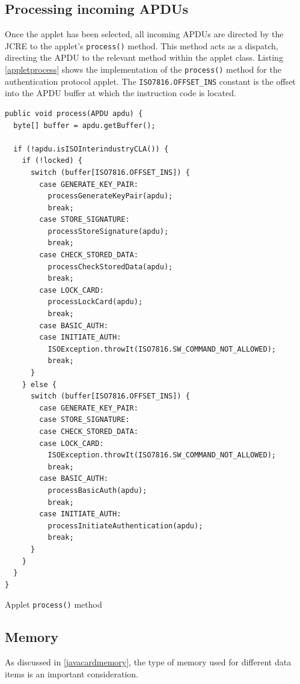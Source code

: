 \documentclass[12pt,a4paper,twoside,openright]{report}
\begin{document}
\subsection{Processing incoming APDUs}

Once the applet has been selected, all incoming APDUs are directed by the JCRE to the applet's \texttt{process()} method. This method acts as a dispatch, directing the APDU to the relevant method within the applet class. Listing \autoref{appletprocess} shows the implementation of the \texttt{process()} method for the authentication protocol applet. The \texttt{ISO7816.OFFSET\_INS} constant is the offset into the APDU buffer at which the instruction code is located.

\begin{listing}
\begin{verbatim}
public void process(APDU apdu) {
  byte[] buffer = apdu.getBuffer();

  if (!apdu.isISOInterindustryCLA()) {
    if (!locked) {
      switch (buffer[ISO7816.OFFSET_INS]) {
        case GENERATE_KEY_PAIR:
          processGenerateKeyPair(apdu);
          break;
        case STORE_SIGNATURE:
          processStoreSignature(apdu);
          break;
        case CHECK_STORED_DATA:
          processCheckStoredData(apdu);
          break;
        case LOCK_CARD:
          processLockCard(apdu);
          break;
        case BASIC_AUTH:
        case INITIATE_AUTH:
          ISOException.throwIt(ISO7816.SW_COMMAND_NOT_ALLOWED);
          break;
      }
    } else {
      switch (buffer[ISO7816.OFFSET_INS]) {
        case GENERATE_KEY_PAIR:
        case STORE_SIGNATURE:
        case CHECK_STORED_DATA:
        case LOCK_CARD:
          ISOException.throwIt(ISO7816.SW_COMMAND_NOT_ALLOWED);
          break;
        case BASIC_AUTH:
          processBasicAuth(apdu);
          break;
        case INITIATE_AUTH:
          processInitiateAuthentication(apdu);
          break;
      }
    }
  }
}
\end{verbatim}
\caption{Applet \texttt{process()} method}
\label{appletprocess}
\end{listing}

\subsection{Memory}

As discussed in \autoref{javacardmemory}, the type of memory used for different data items is an important consideration.
\end{document}
